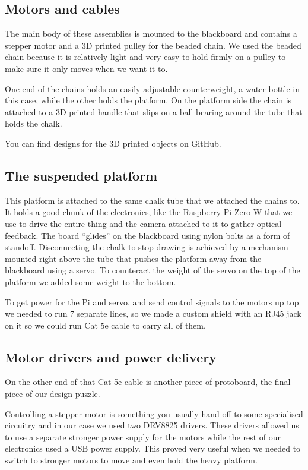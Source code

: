 \documentclass[12pt]{article}
\begin{document}
\subsection*{Motors and cables}
The main body of these assemblies is mounted to the blackboard and
contains a stepper motor and a 3D printed pulley for the beaded chain.
We used the beaded chain because it is relatively light and very
easy to hold firmly on a pulley to make sure it only moves when
we want it to.

One end of the chains holds an easily adjustable counterweight,
a water bottle in this case, while the other holds the platform.
On the platform side the chain is attached to a 3D printed handle
that slips on a ball bearing around the tube that holds the chalk.

You can find designs for the 3D printed objects on GitHub\cite{github}.

\subsection*{The suspended platform}
This platform is attached to the same chalk tube that we attached
the chains to.
It holds a good chunk of the electronics, like the Raspberry Pi Zero W
that we use to drive the entire thing and the camera attached to it
to gather optical feedback.
The board ``glides'' on the blackboard using nylon bolts as a form of
standoff.
Disconnecting the chalk to stop drawing is achieved by a mechanism
mounted right above the tube that pushes the platform away from the
blackboard using a servo.
To counteract the weight of the servo on the top of the platform
we added some weight to the bottom.

To get power for the Pi and servo, and send control signals to the
motors up top we needed to run 7 separate lines, so we made a
custom shield with an RJ45 jack on it so we could run Cat 5e
cable to carry all of them.

\subsection*{Motor drivers and power delivery}
On the other end of that Cat 5e cable is another piece of protoboard,
the final piece of our design puzzle.

Controlling a stepper motor is something you usually hand off to some
specialised circuitry and in our case we used two DRV8825 drivers.
These drivers allowed us to use a separate stronger power supply for
the motors while the rest of our electronics used a USB power supply.
This proved very useful when we needed to switch to stronger motors
to move and even hold the heavy platform.
\end{document}
